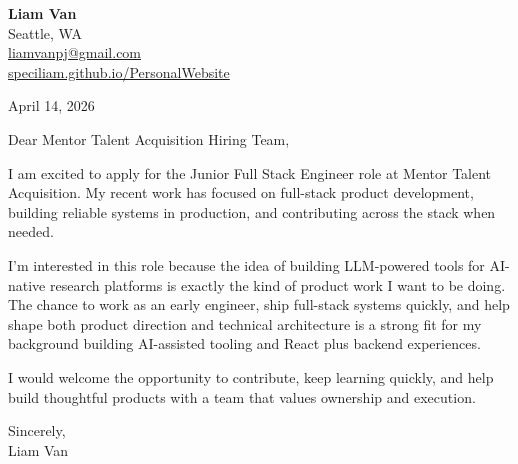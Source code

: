 \documentclass[letterpaper,11pt]{article}
\begin{document}
\begin{flushleft}
\textbf{\Large Liam Van} \\
Seattle, WA \\
\href{mailto:liamvanpj@gmail.com}{liamvanpj@gmail.com} \\
\href{https://speciliam.github.io/PersonalWebsite}{speciliam.github.io/PersonalWebsite}
\end{flushleft}

April 14, 2026

\noindent Dear Mentor Talent Acquisition Hiring Team,

\noindent I am excited to apply for the Junior Full Stack Engineer role at Mentor Talent Acquisition. My recent work has focused on full-stack product development, building reliable systems in production, and contributing across the stack when needed.

\noindent I'm interested in this role because the idea of building LLM-powered tools for AI-native research platforms is exactly the kind of product work I want to be doing. The chance to work as an early engineer, ship full-stack systems quickly, and help shape both product direction and technical architecture is a strong fit for my background building AI-assisted tooling and React plus backend experiences.

\noindent I would welcome the opportunity to contribute, keep learning quickly, and help build thoughtful products with a team that values ownership and execution.

\noindent Sincerely, \\
Liam Van
\end{document}
